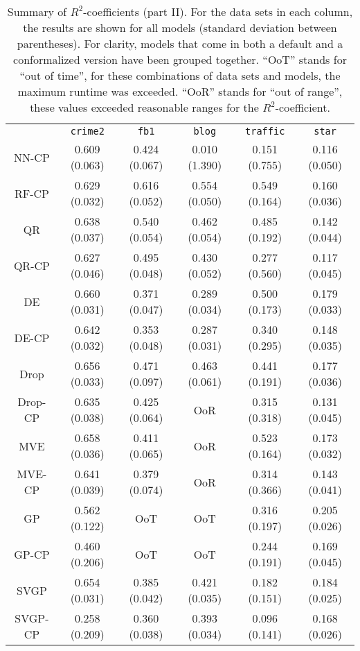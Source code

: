 \documentclass[smallcondensed]{svjour3}
\begin{document}
\begin{appendices}
    \begin{table}[ht!]
        \scriptsize
        \centering
        \renewcommand{\arraystretch}{1.5}
        \begin{tabular}{c||c|c|c|c|c}
            &\texttt{crime2}&\texttt{fb1}&\texttt{blog}&\texttt{traffic}&\texttt{star}\\
            \hhline{======}
            NN-CP&0.609 (0.063)&0.424 (0.067)&0.010 (1.390)&0.151 (0.755)&0.116 (0.050)\\
            \hdashline
            RF-CP&0.629 (0.032)&0.616 (0.052)&0.554 (0.050)&0.549 (0.164)&0.160 (0.036)\\
            \hdashline
            QR&0.638 (0.037)&0.540 (0.054)&0.462 (0.054)&0.485 (0.192)&0.142 (0.044)\\
            QR-CP&0.627 (0.046)&0.495 (0.048)&0.430 (0.052)&0.277 (0.560)&0.117 (0.045)\\
            \hdashline
            DE&0.660 (0.031)&0.371 (0.047)&0.289 (0.034)&0.500 (0.173)&0.179 (0.033)\\
            DE-CP&0.642 (0.032)&0.353 (0.048)&0.287 (0.031)&0.340 (0.295)&0.148 (0.035)\\
            \hdashline
            Drop&0.656 (0.033)&0.471 (0.097)&0.463 (0.061)&0.441 (0.191)&0.177 (0.036)\\
            Drop-CP&0.635 (0.038)&0.425 (0.064)&OoR&0.315 (0.318)&0.131 (0.045)\\
            \hdashline
            MVE&0.658 (0.036)&0.411 (0.065)&OoR&0.523 (0.164)&0.173 (0.032)\\
            MVE-CP&0.641 (0.039)&0.379 (0.074)&OoR&0.314 (0.366)&0.143 (0.041)\\
            \hdashline
            GP&0.562 (0.122)&OoT&OoT&0.316 (0.197)&0.205 (0.026)\\
            GP-CP&0.460 (0.206)&OoT&OoT&0.244 (0.191)&0.169 (0.045)\\
            \hdashline
            SVGP&0.654 (0.031)&0.385 (0.042)&0.421 (0.035)&0.182 (0.151)&0.184 (0.025)\\
            SVGP-CP&0.258 (0.209)&0.360 (0.038)&0.393 (0.034)&0.096 (0.141)&0.168 (0.026)
        \end{tabular}
        \caption{Summary of $R^2$-coefficients (part II). For the data sets in each column, the results are shown for all models (standard deviation between parentheses). For clarity, models that come in both a default and a conformalized version have been grouped together. ``OoT'' stands for ``out of time'', for these combinations of data sets and models, the maximum runtime was exceeded. ``OoR'' stands for ``out of range'', these values exceeded reasonable ranges for the $R^2$-coefficient.}
        \label{table:r2coeff2}
    \end{table}


\end{appendices}
\end{document}
